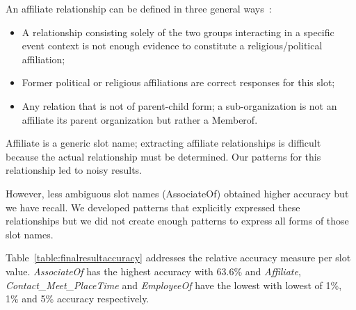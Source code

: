\documentclass[letterpaper]{article}
\begin{document}
An affiliate relationship can be defined in three general ways~\cite{tackbp}:
\begin{itemize}
\item  A relationship consisting solely of the two groups
interacting in a specific event context is not enough evidence to constitute a religious/political affiliation; 
\item Former political or religious affiliations are correct responses for this slot;
\item  Any relation that is not of parent-child form; a sub-organization is not an affiliate its parent organization but rather a Memberof.
\end{itemize}
Affiliate is a generic slot name; extracting affiliate relationships is difficult because the actual relationship must be determined.
Our patterns for this relationship led to noisy results.

However, less ambiguous slot names (AssociateOf) obtained higher accuracy but we have recall.
We developed patterns that explicitly expressed these relationships but we did not create enough patterns to 
express all forms of those slot names.


Table~\ref{table:finalresultaccuracy} addresses the relative accuracy measure per slot value.
\textit{AssociateOf} has the highest accuracy with 63.6\% and \textit{Affiliate}, \textit{Contact\_Meet\_PlaceTime} and \textit{EmployeeOf} have the lowest with lowest of 1\%, 1\% and 5\% accuracy respectively.
\end{document}
